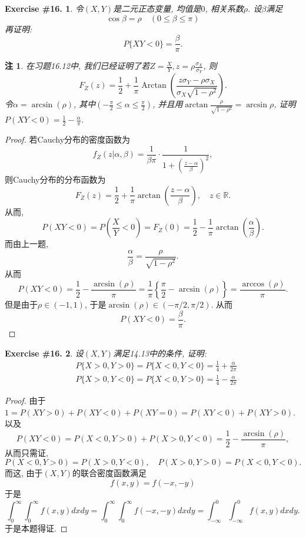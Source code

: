 \documentclass[UTF8, a4paper]{article}
\newtheorem{exercise}{Exercise \#16.}
\newtheorem*{remark}{注}
\begin{document}
\begin{framed}
\begin{exercise}
令\((X,Y)\)是二元正态变量, 均值是\(0\), 相关系数\(\rho\).
设\(\beta\)满足
$$
\cos \beta=\rho \quad(0 \leq \beta \leq \pi)
$$
再证明:
$$
P\{X Y<0\}=\frac{\beta}{\pi} .
$$
\end{exercise}
\end{framed}

\begin{remark}
在习题16.12中, 我们已经证明了若\(Z = \frac{X}{Y}, z = \rho\frac{\sigma_X}{\sigma_Y}\),
则 
$$
F_Z(z)=\frac{1}{2}+\frac{1}{\pi} \operatorname{Arctan}\left(\frac{z \sigma_Y-\rho \sigma_X}{\sigma_X \sqrt{1-\rho^2}}\right) .
$$
令\(\alpha = \arcsin(\rho)\), 其中\(\left(-\frac{\pi}{2} \leq \alpha \leq \frac{\pi}{2}\right)\), 
并且用\(\arctan\frac{\rho}{\sqrt{1 - \rho^2}} = \arcsin \rho\), 证明\(P(XY < 0) = \frac{1}{2} - \frac{\alpha}{\pi}\).
\end{remark}

\begin{proof}
若Cauchy分布的密度函数为 
$$
f_Z(z|\alpha, \beta) = \frac{1}{\beta \pi} \cdot \frac{1}{1 + \left(\frac{z - \alpha}{\beta}\right)^2}, 
$$
则Cauchy分布的分布函数为
$$
F_Z(z) = \frac{1}{2} + \frac{1}{\pi} \arctan \left(\frac{z - \alpha}{\beta}\right), \quad z\in \mathbb{R}.
$$
从而,
$$
P(XY < 0) = P\left(\frac{X}{Y} < 0\right) = F_Z(0) = \frac{1}{2} - \frac{1}{\pi}\arctan\left(\frac{\alpha}{\beta}\right).
$$
而由上一题, 
$$
\frac{\alpha}{\beta} = \frac{\rho}{\sqrt{1 - \rho^2}}.
$$
从而
$$
P(XY < 0 ) = \frac{1}{2} - \frac{\arcsin(\rho)}{\pi} = \frac{1}{\pi} \left\{\frac{\pi}{2} - \arcsin(\rho)\right\} = \frac{\arccos(\rho)}{\pi}.
$$
但是由于\(\rho \in (-1, 1)\), 于是\(\arcsin(\rho) \in (-\pi/2, \pi/2)\).
从而
$$
P(XY < 0) = \frac{\beta}{\pi}.
$$
\end{proof}




\begin{framed}
\begin{exercise}
设\((X,Y)\)满足14.13中的条件, 证明:
$$
\begin{aligned}
& P\{X>0, Y>0\}=P\{X<0, Y<0\}=\frac{1}{4}+\frac{\alpha}{2 \pi} \\
& P\{X>0, Y<0\}=P\{X<0, Y>0\}=\frac{1}{4}-\frac{\alpha}{2 \pi}
\end{aligned}
$$
\end{exercise}
\end{framed}

\begin{proof}
由于\(1 = P(XY > 0) + P(XY < 0) + P(XY = 0) = P(XY < 0) + P(XY > 0)\). 以及
$$
P(XY < 0) = P(X < 0, Y > 0) + P(X > 0,  Y < 0) = \frac{1}{2} - \frac{\arcsin(\rho)}{\pi}, 
$$
从而只需证, 
$$
P(X < 0, Y > 0) = P(X > 0, Y < 0), \quad P(X > 0, Y > 0) = P(X < 0, Y < 0).
$$
而这, 由于\((X,Y)\)的联合密度函数满足
$$
f(x, y) = f(-x, -y)
$$
于是 
$$
\int_{0}^{\infty} \int_{0}^{\infty} f(x, y) dx dy = \int_{0}^{\infty} \int_{0}^{\infty} f(-x, -y) dx dy = \int_{-\infty}^{0} \int_{-\infty}^{0} f(x, y) dx dy.
$$
于是本题得证.




\end{proof}
\end{document}
